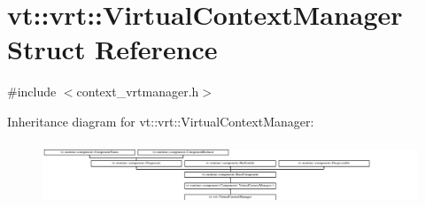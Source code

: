 \hypertarget{structvt_1_1vrt_1_1_virtual_context_manager}{}\section{vt\+:\+:vrt\+:\+:Virtual\+Context\+Manager Struct Reference}
\label{structvt_1_1vrt_1_1_virtual_context_manager}


{\ttfamily \#include $<$context\+\_\+vrtmanager.\+h$>$}

Inheritance diagram for vt\+:\+:vrt\+:\+:Virtual\+Context\+Manager\+:\begin{figure}[H]
\begin{center}
\leavevmode
\includegraphics[height=1.907357cm]{structvt_1_1vrt_1_1_virtual_context_manager}
\end{center}
\end{figure}
